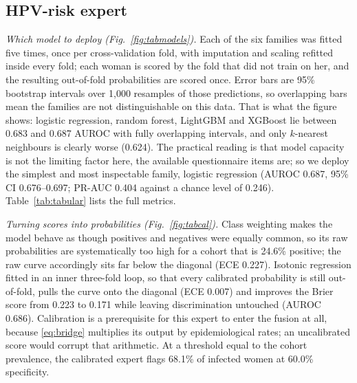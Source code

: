 \documentclass[lettersize,journal]{IEEEtran}
\begin{document}
\subsection{HPV-risk expert}
\emph{Which model to deploy (Fig.~\ref{fig:tabmodels}).} Each of the six families was fitted five times, once per cross-validation fold, with imputation and scaling refitted inside every fold; each woman is scored by the fold that did not train on her, and the resulting out-of-fold probabilities are scored once. Error bars are 95\% bootstrap intervals over 1,000 resamples of those predictions, so overlapping bars mean the families are not distinguishable on this data. That is what the figure shows: logistic regression, random forest, LightGBM and XGBoost lie between 0.683 and 0.687 AUROC with fully overlapping intervals, and only $k$-nearest neighbours is clearly worse (0.624). The practical reading is that model capacity is not the limiting factor here, the available questionnaire items are; so we deploy the simplest and most inspectable family, logistic regression (AUROC 0.687, 95\% CI 0.676--0.697; PR-AUC 0.404 against a chance level of 0.246). Table~\ref{tab:tabular} lists the full metrics.

\emph{Turning scores into probabilities (Fig.~\ref{fig:tabcal}).} Class weighting makes the model behave as though positives and negatives were equally common, so its raw probabilities are systematically too high for a cohort that is 24.6\% positive; the raw curve accordingly sits far below the diagonal (ECE 0.227). Isotonic regression fitted in an inner three-fold loop, so that every calibrated probability is still out-of-fold, pulls the curve onto the diagonal (ECE 0.007) and improves the Brier score from 0.223 to 0.171 while leaving discrimination untouched (AUROC 0.686). Calibration is a prerequisite for this expert to enter the fusion at all, because \eqref{eq:bridge} multiplies its output by epidemiological rates; an uncalibrated score would corrupt that arithmetic. At a threshold equal to the cohort prevalence, the calibrated expert flags 68.1\% of infected women at 60.0\% specificity.
\end{document}
